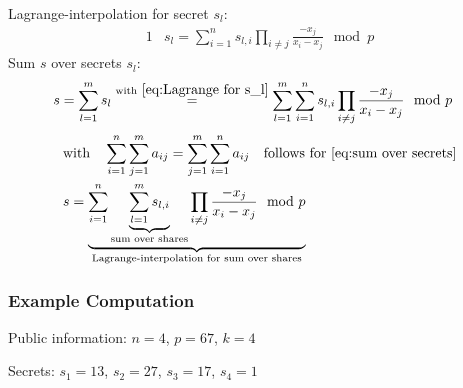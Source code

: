 Lagrange-interpolation for secret $s_l$:
\begin{alignat}{1}
&s_l = \sum_{i=1}^{n}s_{l,i}\prod_{i\neq j}\frac{-x_j}{x_i - x_j} \mod p \label{eq:Lagrange for s_l}
\end{alignat}
Sum $s$ over secrets $s_l$:
\begin{alignat}{1}
&s = \sum_{l=1}^{m} s_l \overset{\text{with} \ \ref{eq:Lagrange for s_l}}{=} \sum_{l=1}^{m} \sum_{i=1}^{n} s_{l,i}\prod_{i\neq j} \frac{-x_j}{x_i-x_j} \mod p \label{eq:sum over secrets}
\end{alignat}
\begin{alignat}{1}
&\text{with} \quad \sum_{i=1}^{n}\sum_{j=1}^{m}a_{ij} = \sum_{j=1}^{m}\sum_{i=1}^{n}a_{ij} \quad \text{follows for \ref{eq:sum over secrets}} \nonumber\\
&s= \underbrace{ \sum_{i=1}^n \underbrace{\sum_{l=1}^{m} s_{l,i}}_{\text{sum over shares}} \prod_{i\neq j} \frac{-x_j}{x_i-x_j} \mod p }_{\text{Lagrange-interpolation for sum over shares}}
\end{alignat}	

\subsubsection{Example Computation}
Public information: $n=4$, $p=67$, $k=4$\par

\noindent Secrets: $s_1=13$, $s_2=27$, $s_3=17$, $s_4=1$\par

